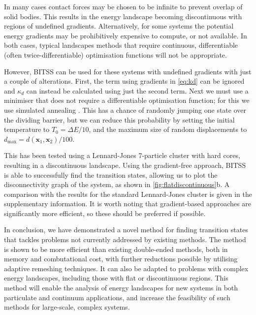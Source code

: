 \documentclass[aps,prl,twocolumn,groupedaddress]{revtex4}
\begin{document}
\topic In many cases contact forces may be chosen to be infinite to prevent overlap of solid bodies.
This results in the energy landscape becoming discontinuous with regions of undefined gradients.
Alternatively, for some systems the potential energy gradients may be prohibitively expensive to compute, or not available.
In both cases, typical landscapes methods that require continuous, differentiable (often twice-differentiable) optimisation functions will not be appropriate.

\topic However, BITSS can be used for these systems with undefined gradients with just a couple of alterations.
First, the term using gradients in \cref{eq:kd} can be ignored and $\kappa_d$ can instead be calculated using just the second term.
Next we must use a minimiser that does not require a differentiable optimisation function; for this we use simulated annealing \cite{Kirkpatrick1983}.
This has a chance of randomly jumping one state over the dividing barrier, but we can reduce this probability by setting the initial temperature to $T_0 = \Delta E / 10$, and the maximum size of random displacements to $d_\text{max} = d(\bm{x}_1, \bm{x}_2) / 100$.

\topic This has been tested using a Lennard-Jones 7-particle cluster with hard cores, resulting in a discontinuous landscape.
Using the gradient-free approach, BITSS is able to successfully find the transition states, allowing us to plot the disconnectivity graph of the system, as shown in \cref{fig:flatdiscontinuous}b.
A comparison with the results for the standard Lennard-Jones cluster is given in the supplementary information.
It is worth noting that gradient-based approaches are significantly more efficient, so these should be preferred if possible.


\topic In conclusion, we have demonstrated a novel method for finding transition states that tackles problems not currently addressed by existing methods.
The method is shown to be more efficient than existing double-ended methods, both in memory and combutational cost, with further reductions possible by utilising adaptive remeshing techniques.
It can also be adapted to problems with complex energy landscapes, including those with flat or discontinuous regions.
This method will enable the analysis of energy landscapes for new systems in both particulate and continuum applications, and increase the feasibility of such methods for large-scale, complex systems.


% 

\end{document}
